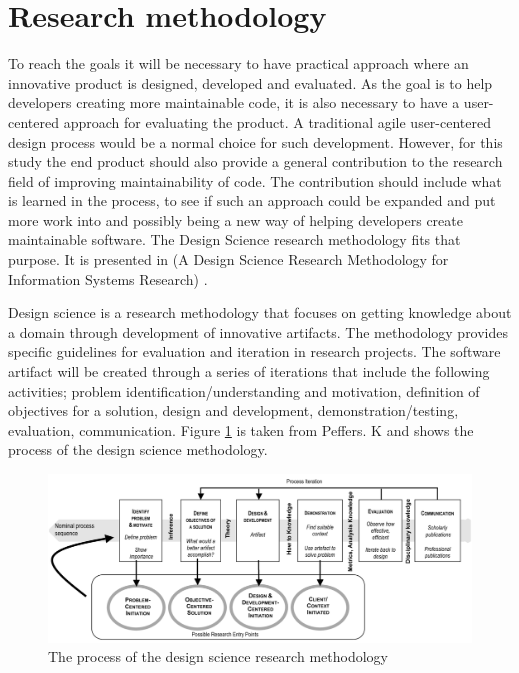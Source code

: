 \documentclass{report}
\begin{document}
\section{Research methodology}
To reach the goals it will be necessary to have practical approach where an innovative product is designed, developed and evaluated. As the goal is to help developers creating more maintainable code, it is also necessary to have a user-centered approach for evaluating the product. A traditional agile user-centered design process would be a normal choice for such development. However, for this study the end product should also provide a general contribution to the research field of improving maintainability of code. The contribution should include what is learned in the process, to see if such an approach could be expanded and put more work into and possibly being a new way of helping developers create maintainable software. The Design Science research methodology fits that purpose. It is presented in (A Design Science Research Methodology for Information Systems Research) \cite{10.2753/MIS0742-1222240302}.

Design science is a research methodology that focuses on getting knowledge about a domain through development of innovative artifacts. The methodology provides specific guidelines for evaluation and iteration in research projects. The software artifact will be created through a series of iterations that include the following activities; problem identification/understanding and motivation, definition of objectives for a solution, design and development, demonstration/testing, evaluation, communication. Figure \ref{fig:designScience} is taken from Peffers. K \cite{Peffers2007ADS} and shows the process of the design science methodology. 

\begin{figure}[h!]
    \centering
    \includegraphics[width=\textwidth]{report/images/designScience.png}
    \caption{The process of the design science research methodology}
    \label{fig:designScience}
\end{figure}
\end{document}
